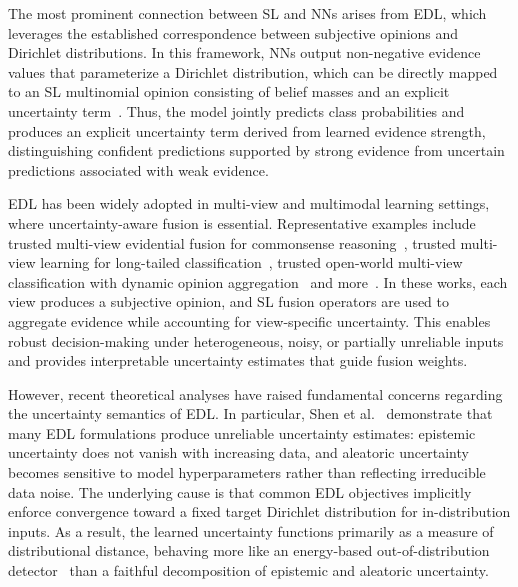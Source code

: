 The most prominent connection between \ac{SL} and \acp{NN} arises from \ac{EDL}, which leverages the established correspondence between subjective opinions and Dirichlet distributions. In this framework, \acp{NN} output non-negative evidence values that parameterize a Dirichlet distribution, which can be directly mapped to an \ac{SL} multinomial opinion consisting of belief masses and an explicit uncertainty term~\cite{sensoy2018evidentialdeeplearningquantify}. Thus, the model jointly predicts class probabilities and produces an explicit uncertainty term derived from learned evidence strength, distinguishing confident predictions supported by strong evidence from uncertain predictions associated with weak evidence.

\ac{EDL} has been widely adopted in multi-view and multimodal learning settings, where uncertainty-aware fusion is essential. Representative examples include trusted multi-view evidential fusion for commonsense reasoning~\cite{yang-2024-trusted}, trusted multi-view learning for long-tailed classification~\cite{tang2025trustedmultiviewlearninglongtailed}, trusted open-world multi-view classification with dynamic opinion aggregation~\cite{10.1145/3746027.3755015} and more~\cite{gao2024comprehensivesurveyevidentialdeep}. In these works, each view produces a subjective opinion, and \ac{SL} fusion operators are used to aggregate evidence while accounting for view-specific uncertainty. This enables robust decision-making under heterogeneous, noisy, or partially unreliable inputs and provides interpretable uncertainty estimates that guide fusion weights.

However, recent theoretical analyses have raised fundamental concerns regarding the uncertainty semantics of \ac{EDL}. In particular, Shen et al.~\cite{10.5555/3737916.3741340} demonstrate that many \ac{EDL} formulations produce unreliable uncertainty estimates: epistemic uncertainty does not vanish with increasing data, and aleatoric uncertainty becomes sensitive to model hyperparameters rather than reflecting irreducible data noise. The underlying cause is that common \ac{EDL} objectives implicitly enforce convergence toward a fixed target Dirichlet distribution for in-distribution inputs. As a result, the learned uncertainty functions primarily as a measure of distributional distance, behaving more like an energy-based out-of-distribution detector~\cite{liu2021energybasedoutofdistributiondetection} than a faithful decomposition of epistemic and aleatoric uncertainty. 

